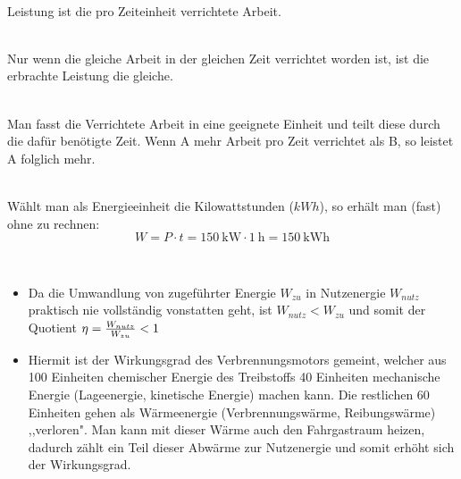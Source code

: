 \documentclass[a4paper]{article}
\begin{document}
\vspace{0.5 cm}

\\
Leistung ist die pro Zeiteinheit verrichtete Arbeit.
\vspace{0.5 cm}

\\
Nur wenn die gleiche Arbeit in der gleichen Zeit verrichtet worden ist, ist die erbrachte Leistung die gleiche.
\vspace{0.5 cm}

\\
Man fasst die Verrichtete Arbeit in eine geeignete Einheit und teilt diese durch die dafür benötigte Zeit. Wenn A mehr Arbeit pro Zeit verrichtet als B, so leistet A folglich mehr.
\vspace{0.5 cm}

\\
Wählt man als Energieeinheit die Kilowattstunden ($kWh$), so erhält man (fast) ohne zu rechnen: 
$$W = P \cdot t = \SI{150}{\kilo\watt} \cdot \SI{1}{\hour} = \SI{150}{\kilo\watt\hour}$$
\vspace{0.5 cm}

\\
\begin{itemize}
	\item Da die Umwandlung von zugeführter Energie $W_{zu}$ in Nutzenergie $W_{nutz}$ praktisch nie vollständig vonstatten geht, ist $W_{nutz} < W_{zu}$ und somit der Quotient $\eta = {W_{nutz} \over W_{zu}} < 1$ 
	\item Hiermit ist der Wirkungsgrad des Verbrennungsmotors gemeint, welcher aus 100 Einheiten chemischer Energie des Treibstoffs 40 Einheiten mechanische Energie (Lageenergie, kinetische Energie) machen kann. Die restlichen 60 Einheiten gehen als Wärmeenergie (Verbrennungswärme, Reibungswärme) ,,verloren". Man kann mit dieser Wärme auch den Fahrgastraum heizen, dadurch zählt ein Teil dieser Abwärme zur Nutzenergie und somit erhöht sich der Wirkungsgrad.
\end{itemize}
\vspace{0.5 cm}
\end{document}
